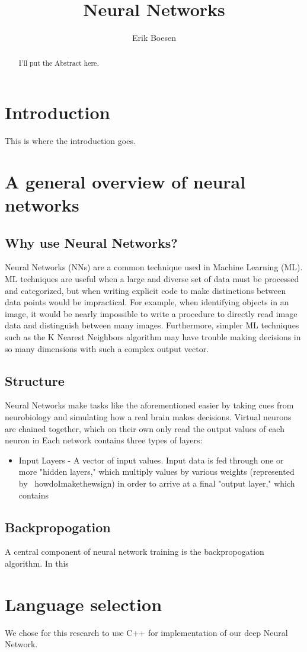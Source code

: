\documentclass{article}
\begin{document}
\title{Neural Networks}
\author{Erik Boesen}

\maketitle

\begin{abstract}
I'll put the Abstract here.
\end{abstract}

\section{Introduction}
This is where the introduction goes.

\section{A general overview of neural networks}
\subsection{Why use Neural Networks?}
Neural Networks (NNs) are a common technique used in Machine Learning (ML). ML techniques are useful when a large and diverse set of data must be processed and categorized, but when writing explicit code to make distinctions between data points would be impractical. For example, when identifying objects in an image, it would be nearly impossible to write a procedure to directly read image data and distinguish between many images. Furthermore, simpler ML techniques such as the K Nearest Neighbors algorithm may have trouble making decisions in so many dimensions with such a complex output vector.

\subsection{Structure}
Neural Networks make tasks like the aforementioned easier by taking cues from neurobiology and simulating how a real brain makes decisions. Virtual neurons are chained together, which on their own only read the output values of each neuron in  Each network contains three types of layers:
\begin{itemize}
\item{Input Layers} - A vector of input values. Input data is fed through one or more "hidden layers," which multiply values by various weights (represented by \ howdoImakethewsign) in order to arrive at a final "output layer," which contains 
\end{itemize}

\subsection{Backpropogation}
A central component of neural network training is the backpropogation algorithm. In this 

\section{Language selection}
We chose for this research to use C++ for implementation of our deep Neural Network.
\end{document}
